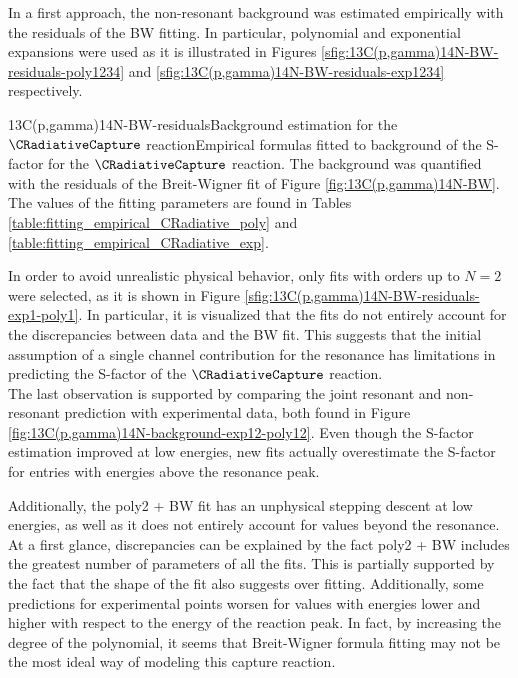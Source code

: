 \documentclass[openany]{book}
\begin{document}
In a first approach, the non-resonant background was estimated empirically with the residuals of the BW fitting. In particular, polynomial and exponential expansions were used as it is illustrated in Figures \ref{sfig:13C(p,gamma)14N-BW-residuals-poly1234} and \ref{sfig:13C(p,gamma)14N-BW-residuals-exp1234} respectively.

{13C(p,gamma)14N-BW-residuals}{Background estimation for the $\CRadiativeCapture$ reaction}{Empirical formulas fitted to background of the S-factor for the $\CRadiativeCapture$ reaction. The background was quantified with the residuals of the Breit-Wigner fit of Figure \ref{fig:13C(p,gamma)14N-BW}. The values of the fitting parameters are found in Tables \ref{table:fitting_empirical_CRadiative_poly} and \ref{table:fitting_empirical_CRadiative_exp}.}

In order to avoid unrealistic physical behavior, only fits with orders up to $N = 2$ were selected, as it is shown in Figure \ref{sfig:13C(p,gamma)14N-BW-residuals-exp1-poly1}. In particular, it is visualized that the fits do not entirely account for the discrepancies between data and the BW fit. This suggests that the initial assumption of a single channel contribution for the resonance has limitations in predicting the S-factor of the $\CRadiativeCapture$ reaction. \\

The last observation is supported by comparing the joint resonant and non-resonant prediction with experimental data, both found in Figure \ref{fig:13C(p,gamma)14N-background-exp12-poly12}. Even though the S-factor estimation improved at low energies, new fits actually overestimate the  S-factor for entries with energies above the resonance peak. 


Additionally, the poly2 + BW fit has an unphysical stepping descent at low energies, as well as it does not entirely account for values beyond the resonance. At a first glance, discrepancies can be explained by the fact poly2 + BW includes the greatest number of parameters of all the fits. This is partially supported by the fact that the shape of the fit also suggests over fitting. Additionally, some predictions for experimental points worsen for values with energies lower and higher with respect to the energy of the reaction peak.  In fact, by increasing the degree of the polynomial, it seems that Breit-Wigner formula fitting may not be the most ideal way of modeling this capture reaction. \\ 
\end{document}
